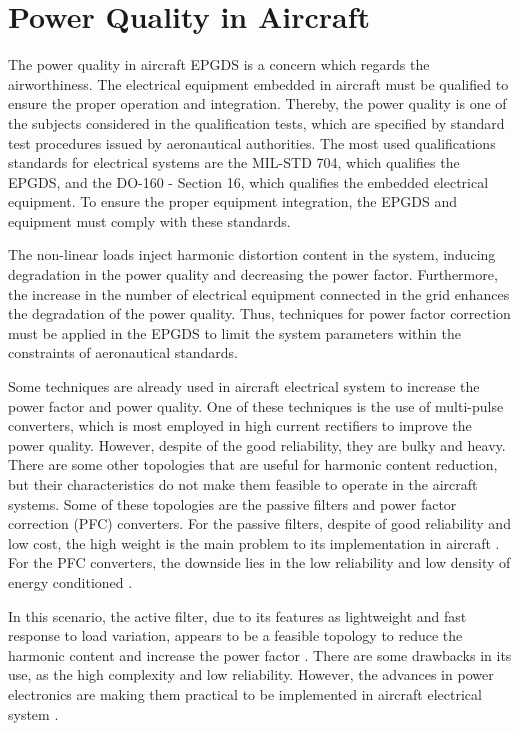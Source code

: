 \section{Power Quality in Aircraft}\label{sec:Power_Quality}

The power quality in aircraft EPGDS is a concern which regards the airworthiness. The electrical equipment embedded in aircraft must be qualified to ensure the proper operation and integration. Thereby, the power quality is one of the subjects considered in the qualification tests, which are specified by standard test procedures issued by aeronautical authorities. The most used qualifications standards for electrical systems are the MIL-STD 704, which qualifies the EPGDS, and the DO-160 - Section 16, which qualifies the embedded electrical equipment. To ensure the proper equipment integration, the EPGDS and equipment must comply with these standards.

The non-linear loads inject harmonic distortion content in the system, inducing degradation in the power quality and decreasing the power factor. Furthermore, the increase in the number of electrical equipment connected in the grid enhances the degradation of the power quality. Thus, techniques for power factor correction must be applied in the EPGDS to limit the system parameters within the constraints of aeronautical standards.

Some techniques are already used in aircraft electrical system to increase the power factor and power quality. One of these techniques is the use of multi-pulse converters, which is most employed in high current rectifiers to improve the power quality. However, despite of the good reliability, they are bulky and heavy. There are some other topologies that are useful for harmonic content reduction, but their characteristics do not make them feasible to operate in the aircraft systems. Some of these topologies are the passive filters and power factor correction (PFC) converters. For the passive filters, despite of good reliability and low cost, the high weight is the main problem to its implementation in aircraft \citep{Barruel2004}. For the PFC converters, the downside lies in the low reliability and low density of energy conditioned \citep{Zhu2014,Gong2003,Lobo2005}. 

In this scenario, the active filter, due to its features as lightweight and fast response to load variation, appears to be a feasible topology to reduce the harmonic content and increase the power factor \citep{Zhu2014,Chen2012control,Karatzaferis2013}. There are some drawbacks in its use, as the high complexity and low reliability. However, the advances in power electronics are making them practical to be implemented in aircraft electrical system \citep{Abdelhafez2009}.
